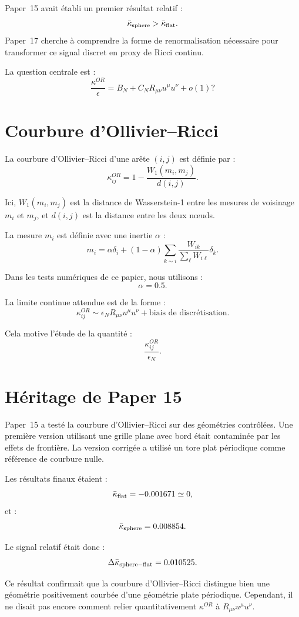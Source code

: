 \documentclass[11pt,a4paper]{article}
\begin{document}
Paper~15 avait établi un premier résultat relatif :
\[
\bar\kappa_{\rm sphere}
>
\bar\kappa_{\rm flat}.
\]
Paper~17 cherche à comprendre la forme de renormalisation nécessaire pour
transformer ce signal discret en proxy de Ricci continu.

La question centrale est :
\[
\boxed{
\frac{\kappa^{OR}}{\epsilon}
=
B_N
+
C_N R_{\mu\nu}u^\mu u^\nu
+
o(1)
?
}
\]

\section{Courbure d'Ollivier--Ricci}

La courbure d'Ollivier--Ricci d'une arête \((i,j)\) est définie par :
\[
\kappa_{ij}^{OR}
=
1-
\frac{W_1(m_i,m_j)}{d(i,j)}.
\]

Ici, \(W_1(m_i,m_j)\) est la distance de Wasserstein-1 entre les mesures de
voisinage \(m_i\) et \(m_j\), et \(d(i,j)\) est la distance entre les deux
nœuds.

La mesure \(m_i\) est définie avec une inertie \(\alpha\) :
\[
m_i
=
\alpha\delta_i
+
(1-\alpha)
\sum_{k\sim i}
\frac{W_{ik}}{\sum_\ell W_{i\ell}}
\delta_k.
\]

Dans les tests numériques de ce papier, nous utilisons :
\[
\alpha=0.5.
\]

La limite continue attendue est de la forme :
\[
\kappa_{ij}^{OR}
\sim
\epsilon_N R_{\mu\nu}u^\mu u^\nu
+
\text{biais de discrétisation}.
\]

Cela motive l'étude de la quantité :
\[
\frac{\kappa_{ij}^{OR}}{\epsilon_N}.
\]

\section{Héritage de Paper 15}

Paper~15 a testé la courbure d'Ollivier--Ricci sur des géométries contrôlées.
Une première version utilisant une grille plane avec bord était contaminée par
les effets de frontière. La version corrigée a utilisé un tore plat périodique
comme référence de courbure nulle.

Les résultats finaux étaient :
\[
\bar\kappa_{\rm flat}
=
-0.001671
\simeq0,
\]
et :
\[
\bar\kappa_{\rm sphere}
=
0.008854.
\]

Le signal relatif était donc :
\[
\Delta\bar\kappa_{\rm sphere-flat}
=
0.010525.
\]

Ce résultat confirmait que la courbure d'Ollivier--Ricci distingue bien une
géométrie positivement courbée d'une géométrie plate périodique. Cependant, il
ne disait pas encore comment relier quantitativement \(\kappa^{OR}\) à
\(R_{\mu\nu}u^\mu u^\nu\).
\end{document}
